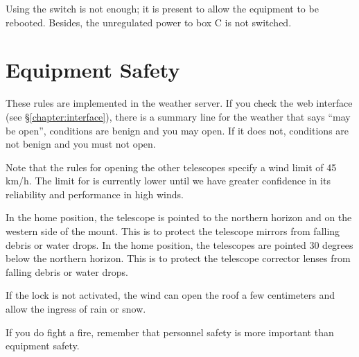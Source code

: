 Using the switch is not enough; it is present to allow the equipment to be rebooted. Besides, the unregulated power to box C is not switched.



\section{Equipment Safety}


These rules are implemented in the {\projectname} weather server. If you check the {\projectname} web interface (see \S\ref{chapter:interface}), there is a summary line for the weather that says “may be open”, conditions are benign and you may open. If it does not, conditions are not benign and you must not open.

Note that the rules for opening the other telescopes specify a wind limit of 45 km/h. The limit for {\projectname} is currently lower until we have greater confidence in its reliability and performance in high winds.


\ifcoatlioan
In the home position, the telescope is pointed to the northern horizon and on the western side of the mount. This is to protect the telescope mirrors from falling debris or water drops.
\fi
\ifddotioan
In the home position, the telescopes are pointed 30 degrees below the northern horizon. This is to protect the telescope corrector lenses from falling debris or water drops.
\fi



If the lock is not activated, the wind can open the roof a few centimeters and allow the ingress of rain or snow.


If you do fight a fire, remember that personnel safety is more important than equipment safety.

